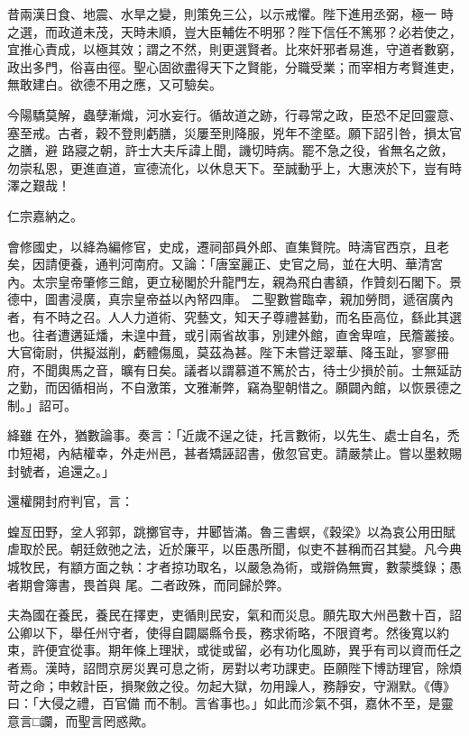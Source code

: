 \begin{pinyinscope}
 昔兩漢日食、地震、水旱之變，則策免三公，以示戒懼。陛下進用丞弼，極一
 時之選，而政道未茂，天時未順，豈大臣輔佐不明邪？陛下信任不篤邪？必若使之，宜推心責成，以極其效；謂之不然，則更選賢者。比來奸邪者易進，守道者數窮，政出多門，俗喜由徑。聖心固欲盡得天下之賢能，分職受業；而宰相方考賢進吏，無敢建白。欲德不用之應，又可驗矣。



 今陽驕莫解，蟲孽漸熾，河水妄行。循故道之跡，行尋常之政，臣恐不足回靈意、塞至戒。古者，穀不登則虧膳，災屢至則降服，兇年不塗塈。願下詔引咎，損太官之膳，避
 路寢之朝，許士大夫斥諱上聞，譏切時病。罷不急之役，省無名之斂，勿崇私恩，更進直道，宣德流化，以休息天下。至誠動乎上，大惠浹於下，豈有時澤之艱哉！



 仁宗嘉納之。



 會修國史，以絳為編修官，史成，遷祠部員外郎、直集賢院。時濤官西京，且老矣，因請便養，通判河南府。又論：「唐室麗正、史官之局，並在大明、華清宮內。太宗皇帝肇修三館，更立秘閣於升龍門左，親為飛白書額，作贊刻石閣下。景德中，圖書浸廣，真宗皇帝益以內帑四庫。
 二聖數嘗臨幸，親加勞問，遞宿廣內者，有不時之召。人人力道術、究藝文，知天子尊禮甚勤，而名臣高位，繇此其選也。往者遭遘延燔，未遑中葺，或引兩省故事，別建外館，直舍卑喧，民簷叢接。大官衛尉，供擬滋削，虧體傷風，莫茲為甚。陛下未嘗迂翠華、降玉趾，寥寥冊府，不聞輿馬之音，曠有日矣。議者以謂慕道不篤於古，待士少損於前。士無延訪之勤，而因循相尚，不自激策，文雅漸弊，竊為聖朝惜之。願闢內館，以恢景德之制。」詔可。



 絳雖
 在外，猶數論事。奏言：「近歲不逞之徒，托言數術，以先生、處士自名，禿巾短褐，內結權幸，外走州邑，甚者矯誣詔書，傲忽官吏。請嚴禁止。嘗以墨敕賜封號者，追還之。」



 還權開封府判官，言：



 蝗亙田野，坌人郛郭，跳擲官寺，井郾皆滿。魯三書螟，《穀梁》以為哀公用田賦虐取於民。朝廷斂弛之法，近於廉平，以臣愚所聞，似吏不甚稱而召其變。凡今典城牧民，有顓方面之執：才者掠功取名，以嚴急為術，或辯偽無實，數蒙獎錄；愚者期會簿書，畏首與
 尾。二者政殊，而同歸於弊。



 夫為國在養民，養民在擇吏，吏循則民安，氣和而災息。願先取大州邑數十百，詔公卿以下，舉任州守者，使得自闢屬縣令長，務求術略，不限資考。然後寬以約束，許便宜從事。期年條上理狀，或徙或留，必有功化風跡，異乎有司以資而任之者焉。漢時，詔問京房災異可息之術，房對以考功課吏。臣願陛下博訪理官，除煩苛之命；申敕計臣，損聚斂之役。勿起大獄，勿用躁人，務靜安，守淵默。《傳》曰：「大侵之禮，百官備
 而不制。言省事也。」如此而沴氣不弭，嘉休不至，是靈意言□讕，而聖言罔惑歟。




\end{pinyinscope}
